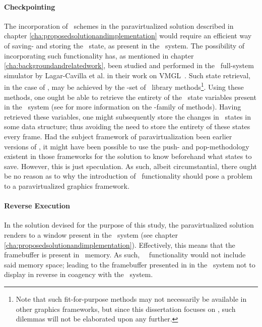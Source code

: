 \paragraph{Checkpointing}
\label{par:discussion_checkpointing}
The incorporation of \dvttermcheckpointrestart\ schemes in the paravirtualized solution described in chapter \ref{cha:proposedsolutionandimplementation} would require an efficient way of saving- and storing the \dvttermopengl\ state, as present in the \dvttermhost\ system.
The possibility of incorporating such functionality has, as mentioned in chapter \ref{cha:backgroundandrelatedwork}, been studied and performed in the \dvttermqemu\ full-system simulator by Lagar-Cavilla et al. in their work on VMGL~.
Such state retrieval, in the case of \dvttermopenglestwopointo , may be achieved by the -set of \dvttermopengl\ library methods\footnote{Note that such fit-for-purpose methods may not necessarily be available in other graphics frameworks, but since this dissertation focuses on \dvttermopenglestwopointo , such dilemmas will not be elaborated upon any further.}.
Using these methods, one ought be able to retrieve the entirety of the \dvttermopengl\ state variables present in the \dvttermhost\ system (see  for more information on the -family of methods).
Having retrieved these variables, one might subsequently store the changes in \dvttermopengl\ states in some data structure; thus avoiding the need to store the entirety of these states every frame.
Had the subject framework of paravirtualization been earlier versions of \dvttermopengl , it might have been possible to use the push- and pop-methodology existent in those frameworks for the solution to know beforehand what states to save.
However, this is just speculation.
As such, albeit circumstantial, there ought be no reason as to why the introduction of \dvttermcheckpoint\ functionality should pose a problem to a paravirtualized graphics framework.

\paragraph{Reverse Execution}
\label{par:discussion_reverseexecution}
In the solution devised for the purpose of this study, the paravirtualized solution renders to a window present in the \dvttermhost\ system (see chapter \ref{cha:proposedsolutionandimplementation}).
Effectively, this means that the framebuffer is present in \dvttermhost\ memory.
As such, \dvttermsimics\ \dvttermreverseexecution\ functionality would not include said memory space; leading to the framebuffer presented in in the \dvttermhost\ system not to display in reverse in coagency with the  \dvttermtarget\ system.

